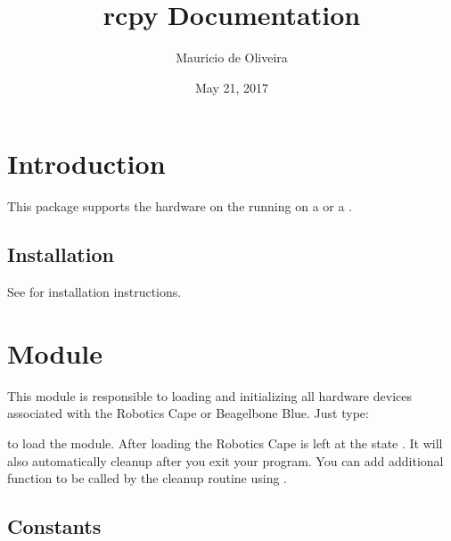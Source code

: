 \documentclass[letterpaper,10pt,english]{sphinxmanual}
\title{rcpy Documentation}
\date{May 21, 2017}
\author{Mauricio de Oliveira}
\begin{document}
\maketitle
\sphinxtableofcontents
{}\label{\detokenize{index::doc}}



\chapter{Introduction}
\label{\detokenize{index:python-3-bindings-for-robotics-cape}}\label{\detokenize{index:introduction}}
This package supports the hardware on the  running on a  or a .


\section{Installation}
\label{\detokenize{index:installation}}
See  for installation instructions.


\chapter{Module }
\label{\detokenize{index:module-rcpy}}\label{\detokenize{index:rcpy}}
This module is responsible to loading and initializing all hardware
devices associated with the Robotics Cape or Beagelbone Blue. Just type:

\begin{sphinxVerbatim}[commandchars=\\\{\}]
 
\end{sphinxVerbatim}

to load the module. After loading the Robotics Cape is left at the
state {\hyperref[\detokenize{index:rcpy.PAUSED}]{}}. It will also automatically cleanup after
you exit your program. You can add additional function to be called by
the cleanup routine using {\hyperref[\detokenize{index:rcpy.add_cleanup}]{}}.


\section{Constants}
\label{\detokenize{index:constants}}
\end{document}
